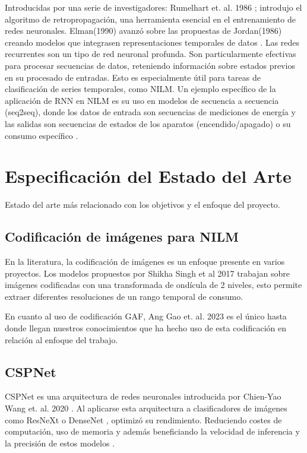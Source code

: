 Introducidas por una serie de investigadores: Rumelhart et. al. 1986 \autocite{Rumelhart1986LearningRB}; introdujo el algoritmo de retropropagación, una herramienta esencial en el entrenamiento de redes neuronales. Elman(1990) avanzó sobre las propuestas de Jordan(1986)\autocite{Jordan1986} creando modelos que integrasen representaciones temporales de datos \autocite{Elman1990} . Las redes recurrentes son un tipo de red neuronal profunda. Son particularmente efectivas para procesar secuencias de datos, reteniendo información sobre estados previos en su procesado de entradas. Esto es especialmente útil para tareas de clasificación de series temporales, como NILM.
Un ejemplo específico de la aplicación de RNN en NILM es su uso en modelos de secuencia a secuencia (seq2seq), donde los datos de entrada son secuencias de mediciones de energía y las salidas son secuencias de estados de los aparatos (encendido/apagado) o su consumo específico \autocite{Huber2014}\autocite{Kaibin2018}.



\section{Especificación del Estado del Arte}
\label{SOTA}
Estado del arte más relacionado con los objetivos y el enfoque del proyecto.
\subsection{Codificación de imágenes para NILM} 

En la literatura, la codificación de imágenes es un enfoque presente en varios proyectos. Los modelos propuestos por Shikha Singh et al 2017 \autocite{Singh2017} trabajan sobre imágenes codificadas con una transformada de ondícula de 2 niveles, esto permite extraer diferentes resoluciones de un rango temporal de consumo.

En cuanto al uso de codificación GAF, Ang Gao et. al. 2023 \autocite{GAO2023109443} es el único hasta donde llegan nuestros conocimientos que ha hecho uso de esta codificación en relación al enfoque del trabajo.

\subsection{CSPNet}     
CSPNet es una arquitectura de redes neuronales introducida por Chien-Yao Wang et. al. 2020 \autocite{CSPNetOG}. 
Al aplicarse esta arquitectura a clasificadores de imágenes como ResNeXt \autocite{xie2017aggregated} o DenseNet \autocite{huang2018densely} , optimizó su rendimiento. Reduciendo costes de computación, uso de memoria y además beneficiando la velocidad de inferencia y la precisión de estos modelos \autocite{CSPNetOG}.

